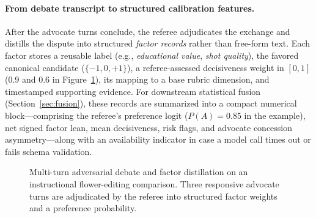 \paragraph{From debate transcript to structured calibration features.}
After the advocate turns conclude, the referee adjudicates the exchange and distills the dispute into structured \emph{factor records} rather than free-form text. Each factor stores a reusable label (e.g., \emph{educational value}, \emph{shot quality}), the favored canonical candidate ($\{-1,0,+1\}$), a referee-assessed decisiveness weight in $[0,1]$ (0.9 and 0.6 in Figure~\ref{fig:factor-distillation}), its mapping to a base rubric dimension, and timestamped supporting evidence. For downstream statistical fusion (Section~\ref{sec:fusion}), these records are summarized into a compact numerical block---comprising the referee's preference logit ($P(A)=0.85$ in the example), net signed factor lean, mean decisiveness, risk flags, and advocate concession asymmetry---along with an availability indicator in case a model call times out or fails schema validation.

\begin{figure}[t]
\centering

\caption{Multi-turn adversarial debate and factor distillation on an instructional flower-editing comparison. Three responsive advocate turns are adjudicated by the referee into structured factor weights and a preference probability.}
\label{fig:factor-distillation}
\end{figure}


